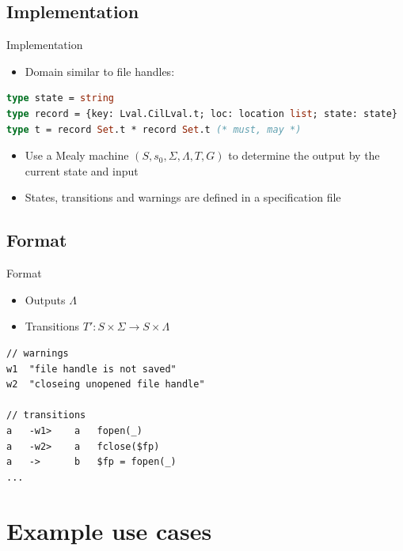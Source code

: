\documentclass{beamer}
\newcommand{\inlineC}[1]{\lstinline[language=C]$#1$}
\begin{document}
\subsection{Implementation}

\begin{frame}[fragile]{Implementation}
\begin{itemize}
\item Domain similar to file handles:
\end{itemize}
\begin{lstlisting}[language=ML]
type state = string
type record = {key: Lval.CilLval.t; loc: location list; state: state}
type t = record Set.t * record Set.t (* must, may *)
\end{lstlisting}
\begin{itemize}
\item Use a Mealy machine $(S, s_0, \Sigma, \Lambda, T, G)$ to determine the output by the current state and input
\item States, transitions and warnings are defined in a specification file
\end{itemize}
\end{frame}

\subsection{Format}

\begin{frame}[fragile]{Format}
\begin{itemize}
\item Outputs $\Lambda$
\item Transitions $T' : S \times \Sigma \to S \times \Lambda$
\end{itemize}
\begin{lstlisting}
// warnings
w1  "file handle is not saved"
w2  "closeing unopened file handle"

// transitions
a   -w1>    a   fopen(_)
a   -w2>    a   fclose($fp)
a   ->      b   $fp = fopen(_)
...
\end{lstlisting}
\end{frame}


\section{Example use cases}
\end{document}
